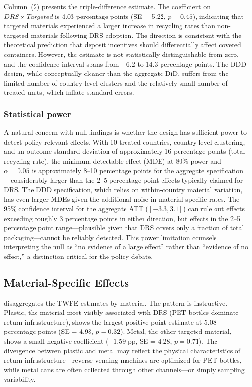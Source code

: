 \documentclass[12pt]{article}
\begin{document}
Column~(2) presents the triple-difference estimate. The coefficient on $DRS \times Targeted$ is 4.03 percentage points (SE = 5.22, $p = 0.45$), indicating that targeted materials experienced a larger increase in recycling rates than non-targeted materials following DRS adoption. The direction is consistent with the theoretical prediction that deposit incentives should differentially affect covered containers. However, the estimate is not statistically distinguishable from zero, and the confidence interval spans from $-6.2$ to 14.3 percentage points. The DDD design, while conceptually cleaner than the aggregate DiD, suffers from the limited number of country-level clusters and the relatively small number of treated units, which inflate standard errors.

\begin{table}[H]

\end{table}

\subsubsection*{Statistical power} A natural concern with null findings is whether the design has sufficient power to detect policy-relevant effects. With 10 treated countries, country-level clustering, and an outcome standard deviation of approximately 16 percentage points (total recycling rate), the minimum detectable effect (MDE) at 80\% power and $\alpha = 0.05$ is approximately 8--10 percentage points for the aggregate specification---considerably larger than the 2--5 percentage point effects typically claimed for DRS. The DDD specification, which relies on within-country material variation, has even larger MDEs given the additional noise in material-specific rates. The 95\% confidence interval for the aggregate ATT ($[-3.3, 3.1]$) can rule out effects exceeding roughly 3 percentage points in either direction, but effects in the 2--5 percentage point range---plausible given that DRS covers only a fraction of total packaging---cannot be reliably detected. This power limitation counsels interpreting the null as ``no evidence of a large effect'' rather than ``evidence of no effect,'' a distinction critical for the policy debate.

\subsection{Material-Specific Effects}

 disaggregates the TWFE estimates by material. The pattern is instructive. Plastic, the material most visibly associated with DRS (PET bottles dominate return infrastructure), shows the largest positive point estimate at 5.08 percentage points (SE = 4.98, $p = 0.32$). Metal, the other targeted material, shows a small negative coefficient ($-1.59$ pp, SE = 4.28, $p = 0.71$). The divergence between plastic and metal may reflect the physical characteristics of return infrastructure---reverse vending machines are optimized for PET bottles, while metal cans are often collected through other channels---or simply sampling variability.
\end{document}
